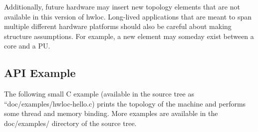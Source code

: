 Additionally, future hardware may insert new topology elements that are not available in this version of hwloc. Long-\/lived applications that are meant to span multiple different hardware platforms should also be careful about making structure assumptions. For example, a new element may someday exist between a core and a PU.\hypertarget{a00379_interface_example}{}\subsection{A\+P\+I Example}\label{a00379_interface_example}
The following small C example (available in the source tree as ``doc/examples/hwloc-\/hello.c\textquotesingle{}\textquotesingle{}) prints the topology of the machine and performs some thread and memory binding. More examples are available in the doc/examples/ directory of the source tree.


